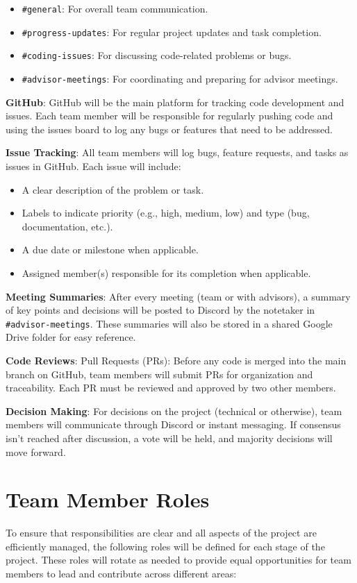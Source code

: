 \documentclass{article}
\begin{document}
\begin{itemize}
    \item \texttt{\#general}: For overall team communication.
    \item \texttt{\#progress-updates}: For regular project updates and task completion.
    \item \texttt{\#coding-issues}: For discussing code-related problems or bugs.
    \item \texttt{\#advisor-meetings}: For coordinating and preparing for advisor meetings.
\end{itemize}

\textbf{GitHub}: GitHub will be the main platform for tracking code development and issues. Each team member will be responsible for regularly pushing code and using the issues board to log any bugs or features that need to be addressed.

\textbf{Issue Tracking}: All team members will log bugs, feature requests, and tasks as issues in GitHub. Each issue will include:
\begin{itemize}
    \item A clear description of the problem or task.
    \item Labels to indicate priority (e.g., high, medium, low) and type (bug, documentation, etc.).
    \item A due date or milestone when applicable.
    \item Assigned member(s) responsible for its completion when applicable.
\end{itemize}

\textbf{Meeting Summaries}:
After every meeting (team or with advisors), a summary of key points and decisions will be posted to Discord by the notetaker in \texttt{\#advisor-meetings}. These summaries will also be stored in a shared Google Drive folder for easy reference.

\textbf{Code Reviews}:
Pull Requests (PRs): Before any code is merged into the main branch on GitHub, team members will submit PRs for organization and traceability. Each PR must be reviewed and approved by two other members.

\textbf{Decision Making}:
For decisions on the project (technical or otherwise), team members will communicate through Discord or instant messaging. If consensus isn’t reached after discussion, a vote will be held, and majority decisions will move forward.

\section{Team Member Roles}
To ensure that responsibilities are clear and all aspects of the project are efficiently managed, the following roles will be defined for each stage of the project. These roles will rotate as needed to provide equal opportunities for team members to lead and contribute across different areas:
\end{document}
